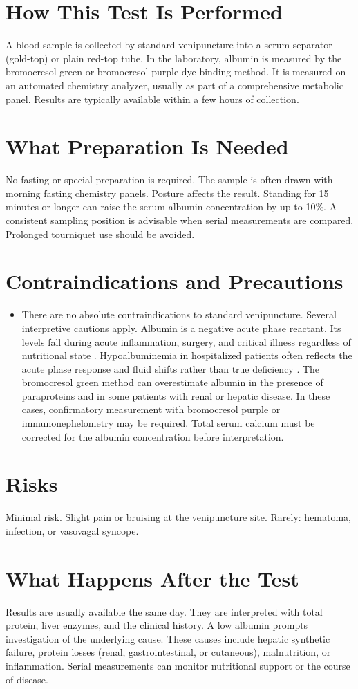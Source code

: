 \section*{How This Test Is Performed}
A blood sample is collected by standard venipuncture into a serum separator (gold-top) or plain red-top tube. In the laboratory, albumin is measured by the bromocresol green or bromocresol purple dye-binding method. It is measured on an automated chemistry analyzer, usually as part of a comprehensive metabolic panel. Results are typically available within a few hours of collection.
\section*{What Preparation Is Needed}
No fasting or special preparation is required. The sample is often drawn with morning fasting chemistry panels. Posture affects the result. Standing for 15 minutes or longer can raise the serum albumin concentration by up to 10\%. A consistent sampling position is advisable when serial measurements are compared. Prolonged tourniquet use should be avoided.
\section*{Contraindications and Precautions}
\begin{itemize}
  \item There are no absolute contraindications to standard venipuncture. Several interpretive cautions apply. Albumin is a negative acute phase reactant. Its levels fall during acute inflammation, surgery, and critical illness regardless of nutritional state \cite{francharcas2001meaning}. Hypoalbuminemia in hospitalized patients often reflects the acute phase response and fluid shifts rather than true deficiency \cite{vincent2003hypoalbuminemia}. The bromocresol green method can overestimate albumin in the presence of paraproteins and in some patients with renal or hepatic disease. In these cases, confirmatory measurement with bromocresol purple or immunonephelometry may be required. Total serum calcium must be corrected for the albumin concentration before interpretation.
\end{itemize}
\section*{Risks}
Minimal risk. Slight pain or bruising at the venipuncture site. Rarely: hematoma, infection, or vasovagal syncope.
\section*{What Happens After the Test}
Results are usually available the same day. They are interpreted with total protein, liver enzymes, and the clinical history. A low albumin prompts investigation of the underlying cause. These causes include hepatic synthetic failure, protein losses (renal, gastrointestinal, or cutaneous), malnutrition, or inflammation. Serial measurements can monitor nutritional support or the course of disease.
